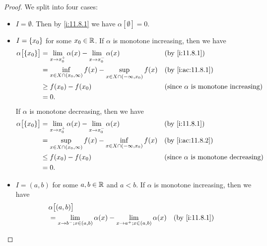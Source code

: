 \begin{proof}
  We split into four cases:
  \begin{itemize}
    \item \(I = \emptyset\).
          Then by \cref{i:11.8.1} we have \(\alpha[\emptyset] = 0\).
    \item \(I = \left\lbrace x_0\right\rbrace\) for some \(x_0 \in \mathbb{R}\).
          If \(\alpha\) is monotone increasing, then we have
          \begin{align*}
            \alpha\big[\set{x_0}\big] & = \lim_{x \to x_0^+} \alpha(x) - \lim_{x \to x_0^-} \alpha(x)                      &  & \by{i:11.8.1}                                    \\
                                      & = \inf_{x \in X \cap (x_0, \infty)} f(x) - \sup_{x \in X \cap (-\infty, x_0)} f(x) &  & \by{i:ac:11.8.1}                                 \\
                                      & \geq f(x_0) - f(x_0)                                                               &  & \text{(since \(\alpha\) is monotone increasing)} \\
                                      & = 0.
          \end{align*}
          If \(\alpha\) is monotone decreasing, then we have
          \begin{align*}
            \alpha\big[\set{x_0}\big] & = \lim_{x \to x_0^+} \alpha(x) - \lim_{x \to x_0^-} \alpha(x)                      &  & \by{i:11.8.1}                                    \\
                                      & = \sup_{x \in X \cap (x_0, \infty)} f(x) - \inf_{x \in X \cap (-\infty, x_0)} f(x) &  & \by{i:ac:11.8.2}                                 \\
                                      & \leq f(x_0) - f(x_0)                                                               &  & \text{(since \(\alpha\) is monotone decreasing)} \\
                                      & = 0.
          \end{align*}
    \item \(I = (a, b)\) for some \(a, b \in \mathbb{R}\) and \(a < b\).
          If \(\alpha\) is monotone increasing, then we have
          \begin{align*}
             & \alpha\big[(a, b)\big]                                                                                                   \\
             & = \lim_{x \to b^- ; x \in (a, b)} \alpha(x) - \lim_{x \to a^+ ; x \in (a, b)} \alpha(x)            &  & \by{i:11.8.1}    \\

\end{align*}
\end{itemize}
\end{proof}
